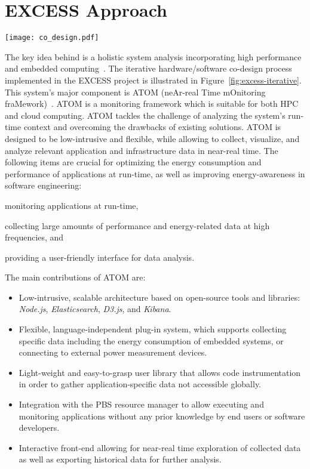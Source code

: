 \documentclass[10pt,letterpaper]{IEEEtran}
\begin{document}
 \section{EXCESS Approach}
\label{sec:excess_approach}

\begin{figure*}[t]
	\centering
	\texttt{[image: co\_design.pdf]}
	\caption{Iterative hardware/software co-design process implemented in the EXCESS project~\cite{koller14}
	}\label{fig:excess-iterative}
\end{figure*}

The key idea behind \EXCESS is a holistic system analysis incorporating high performance and embedded computing~\cite{koller14}.
The iterative hardware/software co-design process implemented in the EXCESS project is illustrated in Figure~\ref{fig:excess-iterative}.
This \EXCESS system's major component is ATOM (neAr-real Time mOnitoring fraMework)~\cite{Hoppe15}. ATOM is a monitoring framework 
which is suitable for both HPC and cloud computing. ATOM tackles the challenge
of analyzing the system's run-time context and overcoming the drawbacks of
existing solutions. ATOM is designed to be
low-intrusive and flexible, while allowing to collect, visualize, and analyze relevant application and infrastructure
data in near-real time. The following items are crucial for optimizing the energy consumption and performance
of applications at run-time, as well as improving energy-awareness in software engineering:

\begin{enumerate*}[label=\itshape\alph*\upshape)]
\item monitoring applications at run-time,
\item collecting large amounts of performance and energy-related data at high frequencies, and
\item providing a user-friendly interface for data analysis.
\end{enumerate*}
The main contributions of ATOM are:
\begin{itemize}
\item Low-intrusive, scalable architecture based on open-source tools and libraries:
\emph{Node.js}, \emph{Elasticsearch}, \emph{D3.js}, and \emph{Kibana}.

\item Flexible, language-independent plug-in system, which supports collecting specific data
including the energy consumption of embedded systems, or connecting to external power measurement devices.

\item Light-weight and easy-to-grasp user library that allows code instrumentation in order to
gather application-specific data not accessible globally.

\item Integration with the PBS resource manager to allow executing and monitoring applications
without any prior knowledge by end users or software developers.

\item Interactive front-end allowing for near-real time exploration of collected data as well as
exporting historical data for further analysis.
\end{itemize}
\end{document}
